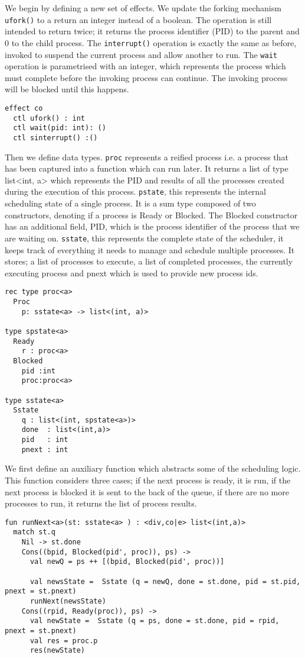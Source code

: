 \documentclass[logo,bsc,singlespacing,parskip]{infthesis}
\begin{document}
We begin by defining a new set of effects. We update the forking mechanism \texttt{ufork()} to a return an integer instead of a boolean. The operation is still intended to return twice; it returns the process identifier (PID) to the parent and 0 to the child process. The \texttt{interrupt()} operation is exactly the same as before, invoked to suspend the current process and allow another to run. The \texttt{wait} operation is parametrised with an integer, which represents the process which must complete before the invoking process can continue. The invoking process will be blocked until this happens.
\begin{lstlisting}
effect co
  ctl ufork() : int
  ctl wait(pid: int): ()
  ctl sinterrupt() :()
\end{lstlisting}


Then we define data types. \texttt{proc} represents a reified process i.e. a process that has been captured into a function which can run later. It returns a list of type list<int, a> which represents the PID and results of all the processes created during the execution of this process.  \texttt{pstate}, this represents the internal scheduling state of a single process. It is a sum type composed of two constructors, denoting if a process is Ready or Blocked. The Blocked constructor has an additional field, PID, which is the process identifier of the process that we are waiting on. \texttt{sstate}, this represents the complete state of the scheduler, it keeps track of everything it needs to manage and schedule multiple processes. It stores; a list of processes to execute, a list of completed processes, the currently executing process and pnext which is used to provide new process ids.
\begin{lstlisting}
rec type proc<a>
  Proc
    p: sstate<a> -> list<(int, a)>

type spstate<a>
  Ready
    r : proc<a>
  Blocked 
    pid :int 
    proc:proc<a>

type sstate<a> 
  Sstate     
    q : list<(int, spstate<a>)>
    done  : list<(int,a)>
    pid   : int
    pnext : int
\end{lstlisting}


We first define an auxiliary function which abstracts some of the scheduling logic. This function considers three cases; if the next process is ready, it is run, if the next process is blocked it is sent to the back of the queue, if there are no more processes to run, it returns the list of process results.

\begin{lstlisting}
fun runNext<a>(st: sstate<a> ) : <div,co|e> list<(int,a)> 
  match st.q
    Nil -> st.done
    Cons((bpid, Blocked(pid', proc)), ps) -> 
      val newQ = ps ++ [(bpid, Blocked(pid', proc))]
      
      val newsState =  Sstate (q = newQ, done = st.done, pid = st.pid, pnext = st.pnext)
      runNext(newsState) 
    Cons((rpid, Ready(proc)), ps) -> 
      val newState =  Sstate (q = ps, done = st.done, pid = rpid, pnext = st.pnext)
      val res = proc.p
      res(newState)
\end{lstlisting}
\end{document}
